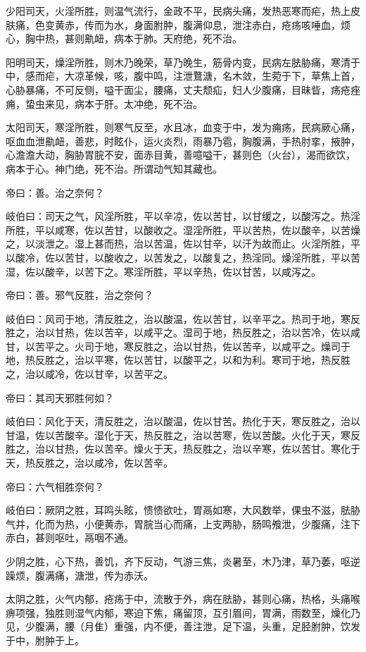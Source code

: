 \documentclass{article}%
\begin{document}
少阳司天，火淫所胜，则温气流行，金政不平，民病头痛，发热恶寒而疟，热上皮肤痛，色变黄赤，传而为水，身面胕肿，腹满仰息，泄注赤白，疮疡咳唾血，烦心，胸中热，甚则鼽衄，病本于肺。天府绝，死不治。

阳明司天，燥淫所胜，则木乃晚荣，草乃晚生，筋骨内变，民病左胠胁痛，寒清于中，感而疟，大凉革候，咳，腹中鸣，注泄鶩溏，名木敛，生菀于下，草焦上首，心胁暴痛，不可反侧，嗌干面尘，腰痛，丈夫颓疝，妇人少腹痛，目昧眥，疡疮痤痈，蛰虫来见，病本于肝。太冲绝，死不治。

太阳司天，寒淫所胜，则寒气反至，水且冰，血变于中，发为痈疡，民病厥心痛，呕血血泄鼽衄，善悲，时眩仆，运火炎烈，雨暴乃雹，胸腹满，手热肘挛，掖肿，心澹澹大动，胸胁胃脘不安，面赤目黄，善噫嗌干，甚则色（火台），渴而欲饮，病本于心。神门绝，死不治。所谓动气知其藏也。

帝曰：善。治之奈何？

岐伯曰：司天之气，风淫所胜，平以辛凉，佐以苦甘，以甘缓之，以酸泻之。热淫所胜，平以咸寒，佐以苦甘，以酸收之。湿淫所胜，平以苦热，佐以酸辛，以苦燥之，以淡泄之。湿上甚而热，治以苦温，佐以甘辛，以汗为故而止。火淫所胜，平以酸冷，佐以苦甘，以酸收之，以苦发之，以酸复之，热淫同。燥淫所胜，平以苦湿，佐以酸辛，以苦下之。寒淫所胜，平以辛热，佐以甘苦，以咸泻之。

帝曰：善。邪气反胜，治之奈何？

岐伯曰：风司于地，清反胜之，治以酸温，佐以苦甘，以辛平之。热司于地，寒反胜之，治以甘热，佐以苦辛，以咸平之。湿司于地，热反胜之，治以苦冷，佐以咸甘，以苦平之。火司于地，寒反胜之，治以甘热，佐以苦辛，以咸平之。燥司于地，热反胜之，治以平寒，佐以苦甘，以酸平之，以和为利。寒司于地，热反胜之，治以咸冷，佐以甘辛，以苦平之。

帝曰：其司天邪胜何如？

岐伯曰：风化于天，清反胜之，治以酸温，佐以甘苦。热化于天，寒反胜之，治以甘温，佐以苦酸辛。湿化于天，热反胜之，治以苦寒，佐以苦酸。火化于天，寒反胜之，治以甘热，佐以苦辛。燥火于天，热反胜之，治以辛寒，佐以苦甘。寒化于天，热反胜之，治以咸冷，佐以苦辛。

帝曰：六气相胜奈何？

岐伯曰：厥阴之胜，耳鸣头眩，愦愦欲吐，胃鬲如寒，大风数举，倮虫不滋，胠胁气并，化而为热，小便黄赤，胃脘当心而痛，上支两胁，肠鸣飧泄，少腹痛，注下赤白，甚则呕吐，鬲咽不通。

少阴之胜，心下热，善饥，齐下反动，气游三焦，炎暑至，木乃津，草乃萎，呕逆躁烦，腹满痛，溏泄，传为赤沃。

太阴之胜，火气内郁，疮疡于中，流散于外，病在胠胁，甚则心痛，热格，头痛喉痹项强，独胜则湿气内郁，寒迫下焦，痛留顶，互引眉间，胃满，雨数至，燥化乃见，少腹满，腰（月隹）重强，内不便，善注泄，足下温，头重，足胫胕肿，饮发于中，胕肿于上。
\end{document}
